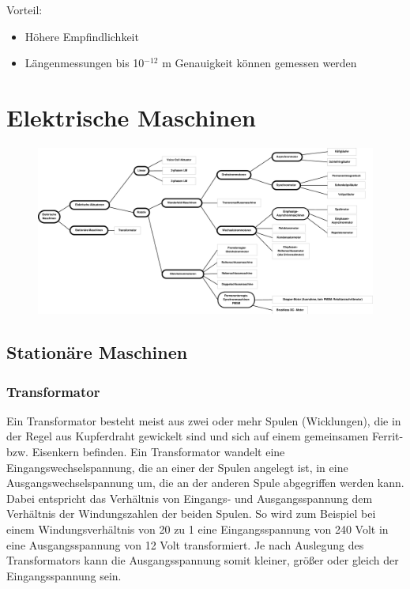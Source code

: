 				Vorteil:
				\begin{itemize}
					\item Höhere Empfindlichkeit 
					\item Längenmessungen bis 10$ ^{-12} $ m Genauigkeit können gemessen werden
				\end{itemize}
		
		
		

	\section{Elektrische Maschinen}
		\leavevmode
		\begin{figure}[h]
			\centering
			\includegraphics[width=1\linewidth]{./pics/el/elMasch}
		\end{figure}
		\subsection{Stationäre Maschinen}
			\subsubsection{Transformator}
				Ein Transformator besteht meist aus zwei oder mehr Spulen (Wicklungen), die in der Regel aus Kupferdraht gewickelt sind und sich auf einem gemeinsamen Ferrit- bzw. Eisenkern befinden. Ein Transformator wandelt eine Eingangswechselspannung, die an einer der Spulen angelegt ist, in eine Ausgangswechselspannung um, die an der anderen Spule abgegriffen werden kann. Dabei entspricht das Verhältnis von Eingangs- und Ausgangsspannung dem Verhältnis der Windungszahlen der beiden Spulen. So wird zum Beispiel bei einem Windungsverhältnis von 20 zu 1 eine Eingangsspannung von 240 Volt in eine Ausgangsspannung von 12 Volt transformiert. Je nach Auslegung des Transformators kann die Ausgangsspannung somit kleiner, größer oder gleich der Eingangsspannung sein.
